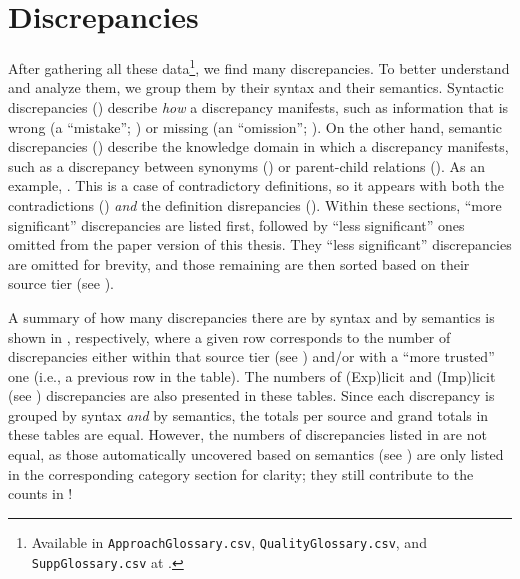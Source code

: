 \section{Discrepancies}
\label{discreps}


After gathering all these data\footnote{Available in \texttt{ApproachGlossary.csv},
    \texttt{QualityGlossary.csv}, and \texttt{SuppGlossary.csv} at .}, we find many
discrepancies. To better understand and analyze them, we group them by their
syntax and their semantics. Syntactic discrepancies ()
describe \emph{how} a discrepancy manifests, such as information that is wrong
(a ``mistake''; ) or missing (an ``omission''; ). On the
other hand, semantic discrepancies () describe the
knowledge domain in which a discrepancy manifests, such as a discrepancy
between synonyms () or parent-child relations ().
As an example, \tourDiscrep*{}. This is a case of contradictory definitions, so
it appears with both the contradictions () \emph{and} the
definition disrepancies (). Within these sections, \ifnotpaper
    ``more significant'' discrepancies are
    listed first, followed by ``less significant'' ones omitted from the paper
    version of this thesis. They \else ``less significant'' discrepancies are
    omitted for brevity, and those remaining \fi are then sorted based on their
source tier (see ).

A summary of how many discrepancies there are by syntax and by semantics is
shown in , respectively, where a given
row corresponds to the number of discrepancies either within that
source tier (see ) and/or with a ``more trusted'' one
(i.e., a previous row in the table). The numbers of (Exp)licit and (Imp)licit
(see ) discrepancies are also presented in these tables. Since
each discrepancy is grouped by syntax \emph{and} by semantics, the totals per
source and grand totals in these tables are equal. However, the numbers of
discrepancies listed in  are not equal,
as those automatically uncovered based on semantics \ifnotpaper
    (see ) \fi are only listed in the corresponding
category section for clarity; they still contribute to the counts in
!

